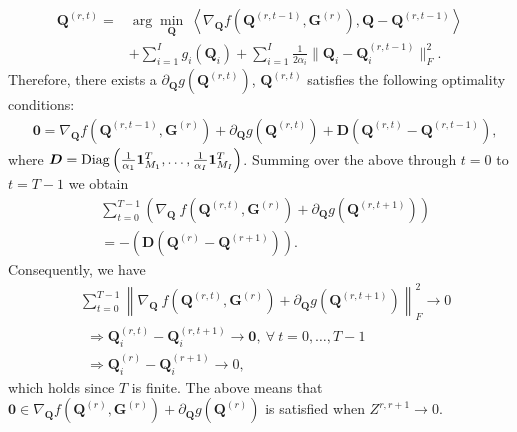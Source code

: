 \documentclass[10pt,journal]{IEEEtran}
\newcommand{\G}{\boldsymbol{G}}
\newcommand{\Q}{\boldsymbol{Q}}
\begin{document}
\begin{align}
\Q^{(r,t)} = &\arg\min_{\Q}~ \left<\nabla_{\Q}f(\Q^{(r,t-1)},\G^{(r)}),\Q -\Q^{(r,t-1)}\right> \nonumber\\
     & + \sum_{i=1}^Ig_i(\Q_i)+\sum_{i=1}^I\frac{1}{2\alpha_i}\|\Q_i-\Q_i^{(r,t-1)}\|_F^2.  \label{eq:q_arg}
\end{align}
Therefore, there exists a $\partial_{\Q}g(\Q^{(r,t)})$, $\Q^{(r,t)}$ satisfies the following optimality conditions:
\begin{align*}
&{\bm 0} = \nabla_{\Q}f(\Q^{(r,t-1)},\G^{(r)}) + \partial_{\Q}g(\Q^{(r,t)})+{\bm D}(\Q^{(r,t)}-\Q^{(r,t-1)}),
\end{align*}
where
${\bm D}={\rm Diag}\left(\frac{1}{\alpha_1}{\bm 1}^T_{M_1},\ldots,\frac{1}{\alpha_I}{\bm 1}^T_{M_I}\right)$.
Summing over the above through $t=0$ to $t=T-1$ we obtain
\begin{equation} \label{eq:q_norm}
\begin{aligned}
&\sum_{t=0}^{T-1}\left(\nabla_{\Q}~f\left(\Q^{(r,t)},\G^{(r)}\right) + \partial_{\Q} g\left(\Q^{(r,t+1)}\right)\right) \\
&= -\left({\bm D}(\Q^{(r)}-\Q^{(r+1)})\right).
\end{aligned}
\end{equation}
Consequently, we have
\begin{align*}
&\sum_{t=0}^{T-1}\left\|\nabla_{\Q}~f\left(\Q^{(r,t)},\G^{(r)}\right) + \partial_{\Q} g\left(\Q^{(r,t+1)}\right) \right\|_F^2 \rightarrow 0 \nonumber\\
&~~\Rightarrow \Q_i^{(r,t)}-\Q_i^{(r,t+1)} \rightarrow {\bm 0},~\forall~t=0,\ldots,T-1\\
&~~\Rightarrow \Q_i^{(r)}-\Q_i^{(r+1)} \rightarrow 0,
\end{align*}
which holds since $T$ is finite.
The above means that 
${\bm 0}\in \nabla_{\Q}f(\Q^{(r)},\G^{(r)}) + \partial_{\Q}g(\Q^{(r)})$
is satisfied when $Z^{r,r+1}\rightarrow 0$.
\end{document}
